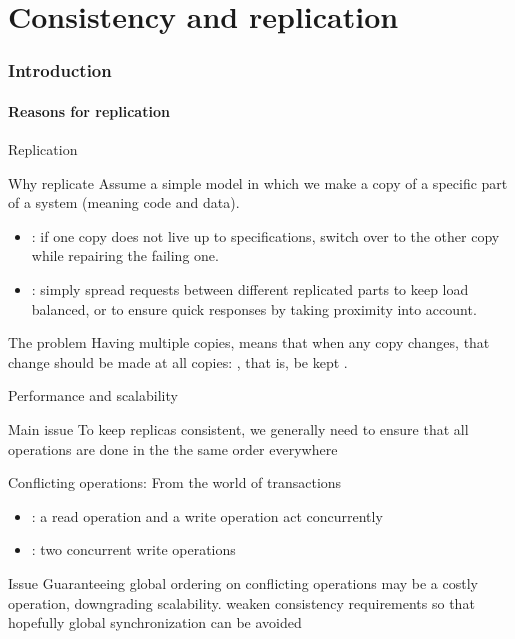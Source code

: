\part{Consistency and replication}
\section{Introduction}
\subsection{Reasons for replication}
\begin{slide}{Replication}
  \begin{block}{Why replicate}
    Assume a simple model in which we make a copy of a specific part of a system (meaning code and data).
    \begin{itemize}
    \item {}: if one copy does not live up to specifications, switch over to the other
      copy while repairing the failing one.
    \item {}: simply spread requests between different replicated parts to keep load balanced,
      or to ensure quick responses by taking proximity into account.
    \end{itemize}
    \begin{alertblock}{The problem}
      Having multiple copies, means that when any copy changes, that change should be made at all copies:
      , that is, be kept .
    \end{alertblock}
  \end{block}
  
\end{slide}
\begin{slide}{Performance and scalability}
  \begin{block}{Main issue} 
    To keep replicas consistent, we generally need to ensure that all  operations are done
    in the the same order everywhere
  \end{block}
  \begin{block}{Conflicting operations: From the world of transactions}
    \begin{itemize}\tightlist
    \item {}: a read operation and a write operation act concurrently
    \item {}: two concurrent write operations
    \end{itemize}
  \end{block}
  \begin{block}{Issue}
    Guaranteeing global ordering on conflicting operations may be a costly operation, downgrading scalability.
     weaken consistency requirements so that hopefully global synchronization can be avoided
  \end{block}
\end{slide}
